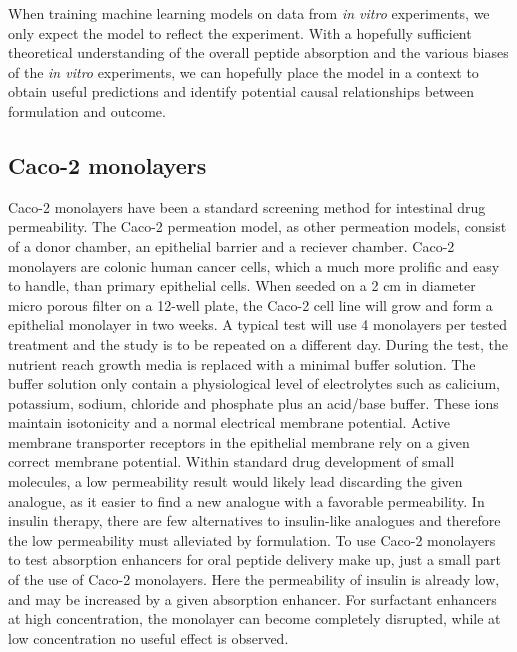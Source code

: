 When training machine learning models on data from \textit{in vitro} experiments, we only expect the model to reflect the experiment. With a hopefully sufficient theoretical understanding of the overall peptide absorption and the various biases of the \textit{in vitro} experiments, we can hopefully place the model in a context to obtain useful predictions and identify potential causal relationships between formulation and outcome.

\subsection{Caco-2 monolayers}
Caco-2 monolayers have been a standard screening method for intestinal drug permeability. The Caco-2 permeation model, as other permeation models, consist of a donor chamber, an epithelial barrier and a reciever chamber. Caco-2 monolayers are colonic human cancer cells, which a much more prolific and easy to handle, than primary epithelial cells. When seeded on a 2 cm in diameter micro porous filter on a 12-well plate, the Caco-2 cell line will grow and form a epithelial monolayer in two weeks. A typical test will use 4 monolayers per tested treatment and the study is to be repeated on a different day. During the test, the nutrient reach growth media is replaced with a minimal buffer solution. The buffer solution only contain a physiological level of electrolytes such as calicium, potassium, sodium, chloride and phosphate plus an acid/base buffer. These ions maintain isotonicity and a normal electrical membrane potential. Active membrane transporter receptors in the epithelial membrane rely on a given correct membrane potential. Within standard drug development of small molecules, a low permeability result would likely lead discarding the given analogue, as it easier to find a new analogue with a favorable permeability. In insulin therapy, there are few alternatives to insulin-like analogues and therefore the low permeability must alleviated by formulation. To use Caco-2 monolayers to test absorption enhancers for oral peptide delivery make up, just a small part of the use of Caco-2 monolayers. Here the permeability of insulin is already low, and may be increased by a given absorption enhancer. For surfactant enhancers at high concentration, the monolayer can become completely disrupted, while at low concentration no useful effect is observed.

